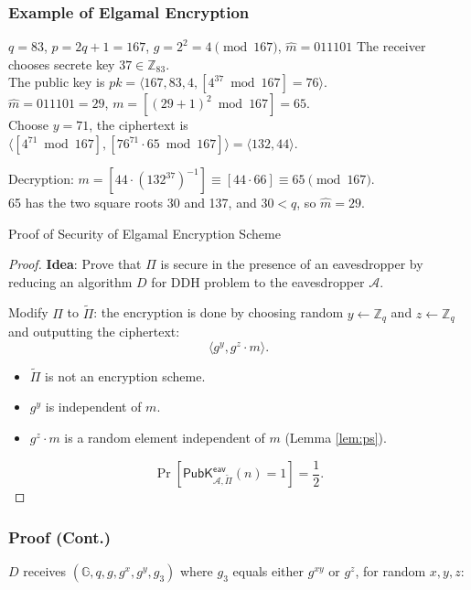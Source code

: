 \begin{frame}\frametitle{Example of Elgamal Encryption}
\begin{exampleblock}{$q=83$, $p=2q+1=167$, $g=2^2=4 \pmod{167}$, $\hat{m}=011101$}
The receiver chooses secrete key $37 \in \mathbb{Z}_{83}$.\\
The public key is $pk=\langle 167,83,4,[4^{37} \bmod 167]=76\rangle$.\\
$\hat{m}=011101=29$, $m = [(29+1)^2 \bmod 167] = 65$.\\
Choose $y=71$, the ciphertext is $\langle [4^{71} \bmod 167], [76^{71}\cdot 65 \bmod 167]\rangle = \langle 132,44\rangle$.
\newline

Decryption: $m= [44\cdot (132^{37})^{-1}] \equiv [44\cdot 66] \equiv 65 \pmod{167}$.\\
65 has the two square roots 30 and 137, and $30 < q$, so $\hat{m}=29$.
\end{exampleblock}
\end{frame}
\begin{frame}{Proof of Security of Elgamal Encryption Scheme}
\begin{proof}
\textbf{Idea}: Prove that $\Pi$ is secure in the presence of an eavesdropper by reducing an algorithm $D$ for DDH problem to the eavesdropper $\mathcal{A}$.
\newline

Modify $\Pi$ to $\tilde{\Pi}$: the encryption is done by choosing random $y \gets \mathbb{Z}_q$ and $z \gets \mathbb{Z}_q$ and outputting the ciphertext:
\[ \langle g^y, g^z\cdot m\rangle.\]
\begin{itemize}
\item $\tilde{\Pi}$ is not an encryption scheme.
\item $g^y$ is independent of $m$.
\item $g^z\cdot m$ is a random element independent of $m$ (Lemma \ref{lem:ps}).
\end{itemize}
\[ \Pr\left[\mathsf{PubK}^{\mathsf{eav}}_{\mathcal{A},\tilde{\Pi}}(n)=1\right] = \frac{1}{2}.\]
\end{proof}
\end{frame}
\begin{frame}\frametitle{Proof (Cont.)}
$D$ receives $(\mathbb{G},q,g,g^x,g^y,g_3)$ where $g_3$ equals either $g^{xy}$ or $g^z$, for random $x, y, z$:
\begin{figure}
\begin{center}

\end{center}
\end{figure}
\end{frame}
